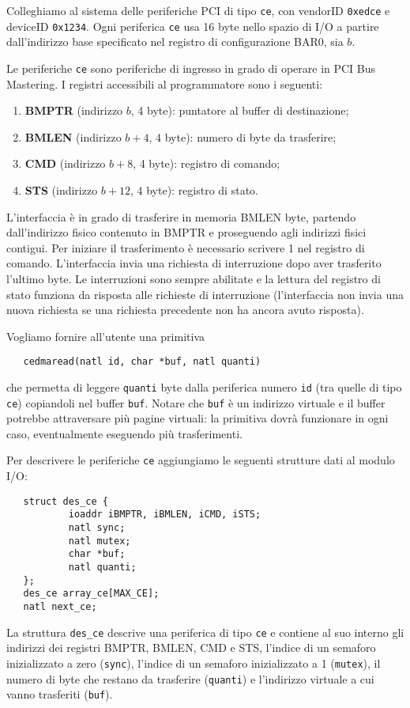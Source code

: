 Colleghiamo al sistema delle periferiche PCI di tipo \verb|ce|, con vendorID \verb|0xedce| e deviceID \verb|0x1234|.
Ogni periferica \verb|ce| usa 16 byte nello spazio di I/O a partire dall'indirizzo base specificato nel
registro di configurazione BAR0, sia $b$.

Le periferiche \verb|ce| sono periferiche di ingresso in grado di operare in PCI Bus Mastering.
I registri accessibili al programmatore sono i seguenti:
\begin{enumerate}
  \item {\bf BMPTR} (indirizzo $b$, 4 byte): puntatore al buffer di destinazione;
  \item {\bf BMLEN} (indirizzo $b+4$, 4 byte): numero di byte da trasferire;
  \item {\bf CMD} (indirizzo $b+8$, 4 byte): registro di comando;
  \item {\bf STS} (indirizzo $b+12$, 4 byte): registro di stato.
\end{enumerate}
L'interfaccia \`e in grado di trasferire in memoria BMLEN byte, partendo dall'indirizzo fisico contenuto
in BMPTR e proseguendo agli indirizzi fisici contigui. Per iniziare il trasferimento \`e necessario scrivere 1 nel registro di comando.
L'interfaccia invia una richiesta di interruzione dopo aver trasferito l'ultimo byte.
Le interruzioni sono sempre abilitate e la lettura del registro di stato funziona da risposta alle richieste di interruzione
(l'interfaccia non invia una nuova richiesta se una richiesta precedente non ha ancora avuto risposta).

Vogliamo fornire all'utente una primitiva 
\begin{verbatim}
   cedmaread(natl id, char *buf, natl quanti)
\end{verbatim}
che permetta di leggere \verb|quanti| byte dalla periferica numero \verb|id| (tra quelle di tipo \verb|ce|) copiandoli
nel buffer \verb|buf|. Notare che \verb|buf| \`e un indirizzo virtuale e il buffer potrebbe attraversare pi\`u
pagine virtuali: la primitiva dovr\`a funzionare in ogni caso, eventualmente eseguendo pi\`u trasferimenti.

Per descrivere le periferiche \verb|ce| aggiungiamo le seguenti strutture dati al modulo I/O:
\begin{verbatim}
   struct des_ce {
           ioaddr iBMPTR, iBMLEN, iCMD, iSTS;
           natl sync;
           natl mutex;
           char *buf;
           natl quanti;
   };
   des_ce array_ce[MAX_CE];
   natl next_ce;
\end{verbatim}
La struttura \verb|des_ce| descrive una periferica di tipo \verb|ce| e contiene al suo interno gli indirizzi
dei registri BMPTR, BMLEN, CMD e STS, l'indice di un semaforo inizializzato a zero (\verb|sync|), l'indice di un semaforo
inizializzato a 1 (\verb|mutex|), il numero di byte che restano da trasferire (\verb|quanti|) e l'indirizzo virtuale
a cui vanno trasferiti (\verb|buf|).

